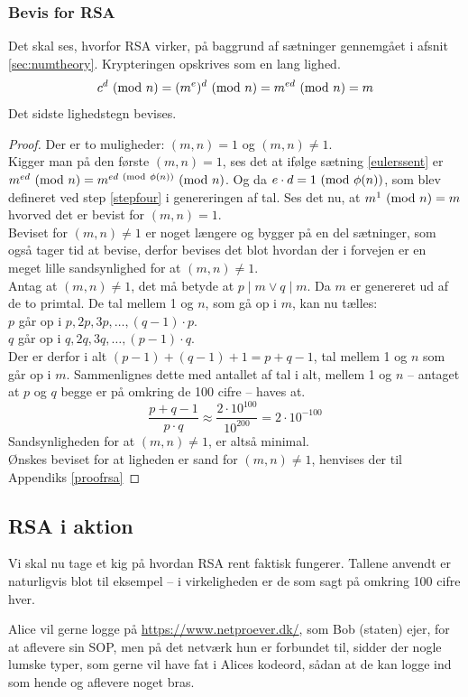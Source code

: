 \subsubsection{Bevis for RSA}
Det skal ses, hvorfor RSA virker, på baggrund af sætninger gennemgået i afsnit \ref{sec:numtheory}.
Krypteringen opskrives som en lang lighed.\cite[83]{ruc}
\[c^d \ (\mathrm{mod}\ n) = (m^e)^d \ (\mathrm{mod}\ n) = m^{ed} \ (\mathrm{mod}\ n) = m\]
Det sidste lighedstegn bevises.
\begin{proof}
        Der er to muligheder: \((m, n) = 1\) og \((m, n) \neq 1\).\\
        Kigger man på den første \((m, n) = 1\), ses det at ifølge sætning \ref{eulerssent} er \(m^{ed} \ (\mathrm{mod}\ n) = m^{ed \ (\mathrm{mod}\ \phi(n))} \ (\mathrm{mod}\ n)\).
        Og da \(e \cdot d = 1 \ (\mathrm{mod}\ \phi(n))\), som blev defineret ved step \ref{stepfour} i genereringen af tal.
        Ses det nu, at \(m^1 \ (\mathrm{mod}\ n) = m\) hvorved det er bevist for \((m, n) = 1\).\\
        Beviset for \((m, n) \neq 1\) er noget længere og bygger på en del sætninger, som også tager tid at bevise, derfor bevises det blot hvordan der i forvejen er en meget lille sandsynlighed for at \((m, n) \neq 1\).\\
        Antag at \((m, n) \neq 1\), det må betyde at \(p \mid m \lor q \mid m\). Da \(m\) er genereret ud af de to primtal.
        De tal mellem 1 og \(n\), som gå op i \(m\), kan nu tælles:\\
        \(p\) går op i \(p, 2p, 3p, \hdots , (q - 1) \cdot p\).\\
        \(q\) går op i \(q, 2q, 3q, \hdots , (p - 1) \cdot q\).\\
        Der er derfor i alt \((p - 1) + (q - 1) + 1 = p + q - 1\), tal mellem 1 og \(n\) som går op i \(m\).
        Sammenlignes dette med antallet af tal i alt, mellem 1 og \(n\) -- antaget at \(p\) og \(q\) begge er på omkring de 100 cifre -- haves at.
        \[\frac{p + q - 1}{p \cdot q} \approx \frac{2 \cdot 10^{100}}{10^{200}} = 2 \cdot 10^{-100}\]
        Sandsynligheden for at \((m, n) \neq 1\), er altså minimal.\cite[106]{krypto}\\
        Ønskes beviset for at ligheden er sand for \((m, n) \neq 1\), henvises der til Appendiks \ref{proofrsa}
\end{proof}


\subsection{RSA i aktion}
Vi skal nu tage et kig på hvordan RSA rent faktisk fungerer.
Tallene anvendt er naturligvis blot til eksempel -- i virkeligheden er de som sagt på omkring 100 cifre hver.
\par
Alice vil gerne logge på \url{https://www.netproever.dk/}, som Bob (staten) ejer, for at aflevere sin SOP, men på det netværk hun er forbundet til, sidder der nogle lumske typer, som gerne vil have fat i Alices kodeord, sådan at de kan logge ind som hende og aflevere noget bras.

